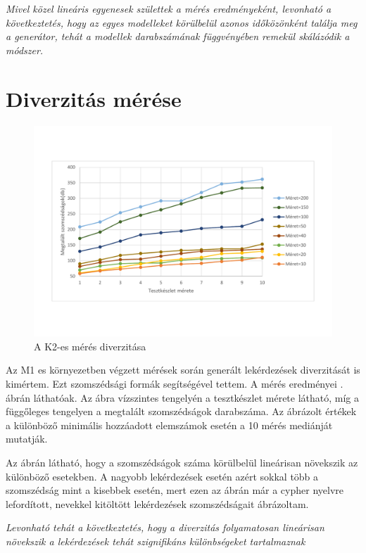 \textit{Mivel közel lineáris egyenesek születtek a mérés eredményeként, levonható a következtetés, hogy az egyes modelleket körülbelül azonos időközönként találja meg a generátor,  tehát a modellek darabszámának függvényében remekül skálázódik a módszer.}

\section{Diverzitás mérése}


\begin{figure}
	\centering
	\includegraphics[width=1\textwidth]{figures/diversityB}
	\caption{A K2-es mérés diverzitása}
	\label{fig:BDiversity}
\end{figure}

Az M1 es környezetben végzett mérések során generált lekérdezések diverzitását is kimértem. Ezt szomszédsági formák segítségével tettem. A mérés eredményei . ábrán láthatóak. Az ábra vízszintes tengelyén a tesztkészlet mérete látható, míg a függőleges tengelyen a megtalált szomszédságok darabszáma. Az ábrázolt értékek a különböző minimális hozzáadott elemszámok esetén a 10 mérés mediánját mutatják.

Az ábrán látható, hogy a szomszédságok száma körülbelül lineárisan növekszik az különböző esetekben. A nagyobb lekérdezések esetén azért sokkal több a szomszédság mint a kisebbek esetén, mert ezen az ábrán már a cypher nyelvre lefordított, nevekkel kitöltött lekérdezések szomszédságait ábrázoltam.

\textit{Levonható tehát a következtetés, hogy a diverzitás folyamatosan lineárisan növekszik a lekérdezések tehát szignifikáns különbségeket tartalmaznak}  

